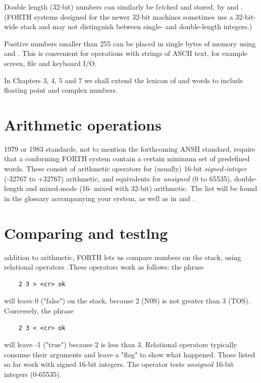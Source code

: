 Double length (32-bit) numbers can similarly be f\textit{etc}hed and stored, by  and  . (FORTH systems designed for the newer 32-bit machines sometimes use a 32-bit-wide stack and may not distinguish between single- and double-length integers.)

Positive numbers smaller than 255 can be placed in single bytes of memory using  and . This is convenient for operations with strings of ASCII text, for example screen, file and keyboard I/O.

In Chapters 3, 4, 5 and 7 we shall extend the lexicon of  and \bc{!} words to include floating point and complex numbers.

\section{Arithmetic operations} 

 1979 or 1983 standards, not to mention the forthcoming ANSII standard, require that a conforming FORTH system contain a certain minimum set of predefined words. These consist of arithmetic operators  for (usually) 16-bit \textit{signed-integer} (-32767 to +32767) arithmetic, and equivalents for \textit{unsigned} (0 to 65535), double-length and mixed-mode (16- mixed with 32-bit) arithmetic. The list will be found in the glossary accompanying your system, as well as in \SF and \FTR.

\section{Comparing and testlng}

 addition to arithmetic, FORTH lets us compare numbers on the stack, using relational operators \bc{> < =}.These operators work as follows: the phrase

\begin{lstlisting}
    2 3 > <cr> ok
\end{lstlisting}

will leave 0 ("false") on the stack, because 2 (N0S) is not greater
than 3 (TOS). Conversely, the phrase

\begin{lstlisting}
    2 3 < <cr> ok
\end{lstlisting}

will leave -1 ("true") because 2 is less than 3. Relational operators typically consume their arguments and leave a "flag" to show what happened. Those listed so far work with signed 16-bit integers. The operator  tests \textit{unsigned} 16-bit integers (0-65535).

